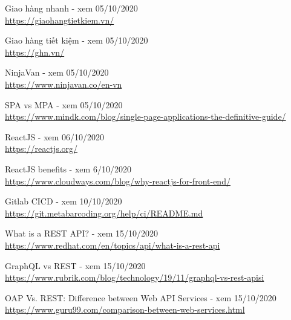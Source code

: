 \documentclass[12pt,a4paper,oneside]{book}
\begin{document}
	\frontmatter
	
	
	

	\tableofcontents
	\listoffigures
	\newpage
	
	\mainmatter
	
	
	
    
    
    
    
    
    
    \begin{thebibliography}{80}
        
        \bibitem{} Giao hàng nhanh - xem 05/10/2020\\
        \url{https://giaohangtietkiem.vn/}
        
        \bibitem{} Giao hàng tiết kiệm - xem 05/10/2020\\
        \url{https://ghn.vn/}
        
        \bibitem{} NinjaVan - xem 05/10/2020\\
        \url{https://www.ninjavan.co/en-vn}
    
        \bibitem{} SPA vs MPA - xem 05/10/2020\\
        \url{https://www.mindk.com/blog/single-page-applications-the-definitive-guide/}
        
        \bibitem{} ReactJS - xem 06/10/2020\\
        \url{https://reactjs.org/}
    
        \bibitem{} ReactJS benefits - xem 6/10/2020\\
        \url{https://www.cloudways.com/blog/why-reactjs-for-front-end/}
    
        \bibitem{} Gitlab CICD - xem 10/10/2020\\
        \url{https://git.metabarcoding.org/help/ci/README.md}    
        
        \bibitem{} What is a REST API? - xem 15/10/2020\\
        \url{https://www.redhat.com/en/topics/api/what-is-a-rest-api} 
        
        \bibitem{} GraphQL vs REST - xem 15/10/2020\\
        \url{https://www.rubrik.com/blog/technology/19/11/graphql-vs-rest-apisi} 
        
        \bibitem{} OAP Vs. REST: Difference between Web API Services - xem 15/10/2020\\
        \url{https://www.guru99.com/comparison-between-web-services.html}  
        

\end{thebibliography}
\end{document}
